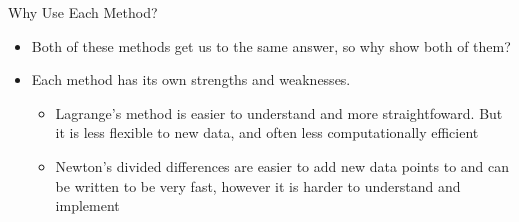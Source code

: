 {}\documentclass[letterpaper,
compress,
xcolor=x11names,
]{beamer}
\begin{document}
\begin{frame}{Why Use Each Method?}
	\footnotesize
	\begin{itemize}
		\item Both of these methods get us to the same answer, so why show both of them? 
		\item Each method has its own strengths and weaknesses.
		\begin{itemize}
			\item Lagrange's method is easier to understand and more straightfoward. But it is less flexible to new data, and often less computationally efficient
			\item Newton's divided differences are easier to add new data points to and can be written to be very fast, however it is harder to understand and implement
		\end{itemize}
	\end{itemize}
\end{frame}

\end{document}
